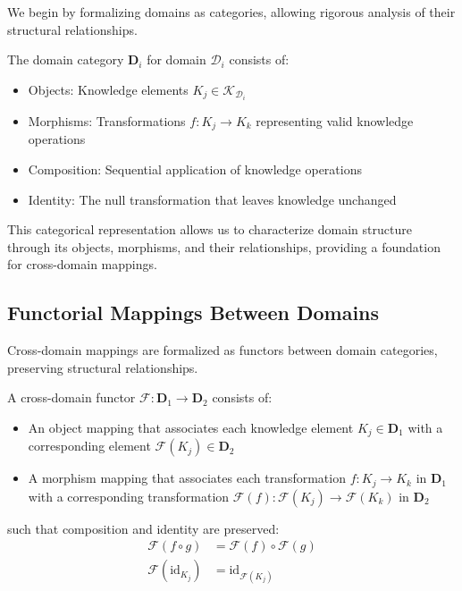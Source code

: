 We begin by formalizing domains as categories, allowing rigorous analysis of their structural relationships.

\begin{definition}
The domain category $\mathbf{D}_i$ for domain $\mathcal{D}_i$ consists of:
\begin{itemize}
    \item Objects: Knowledge elements $K_j \in \mathcal{K}_{\mathcal{D}_i}$
    \item Morphisms: Transformations $f: K_j \rightarrow K_k$ representing valid knowledge operations
    \item Composition: Sequential application of knowledge operations
    \item Identity: The null transformation that leaves knowledge unchanged
\end{itemize}
\end{definition}

This categorical representation allows us to characterize domain structure through its objects, morphisms, and their relationships, providing a foundation for cross-domain mappings.

\subsection{Functorial Mappings Between Domains}

Cross-domain mappings are formalized as functors between domain categories, preserving structural relationships.

\begin{definition}
A cross-domain functor $\mathcal{F}: \mathbf{D}_1 \rightarrow \mathbf{D}_2$ consists of:
\begin{itemize}
    \item An object mapping that associates each knowledge element $K_j \in \mathbf{D}_1$ with a corresponding element $\mathcal{F}(K_j) \in \mathbf{D}_2$
    \item A morphism mapping that associates each transformation $f: K_j \rightarrow K_k$ in $\mathbf{D}_1$ with a corresponding transformation $\mathcal{F}(f): \mathcal{F}(K_j) \rightarrow \mathcal{F}(K_k)$ in $\mathbf{D}_2$
\end{itemize}
such that composition and identity are preserved:
\begin{align}
\mathcal{F}(f \circ g) &= \mathcal{F}(f) \circ \mathcal{F}(g) \\
\mathcal{F}(\text{id}_{K_j}) &= \text{id}_{\mathcal{F}(K_j)}
\end{align}
\end{definition}

